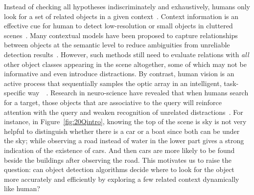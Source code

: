 Instead of checking all hypotheses indiscriminately and exhaustively, humans only look for a set of related objects in a given context~\cite{biederman1982scene, hock1974contextual}. Context information is an effective cue for human to detect low-resolution or small objects in cluttered scenes~\cite{parikh2012exploring}. Many contextual models have been proposed to capture relationships between objects at the semantic level to reduce ambiguities from unreliable detection results~\cite{gould2009decomposing, galleguillos2010context, ladicky2010graph}. %
However, such methods still need to evaluate  relations with \emph{all} other object classes appearing in the scene altogether, some of which may not be informative and even introduce distractions.  By contrast, human vision is an active process that sequentially samples the optic array in an intelligent, task-specific way~\cite{najemnik2005optimal}~. Research in neuro-science have revealed that when humans search for a target, those objects that are associative to the query will reinforce attention with the query and weaken recognition of unrelated distractions~\cite{moores2003associative}. 
For instance, in Figure~\ref{fig:20Qintro}, knowing the top of the scene is sky is not very helpful to distinguish whether there is a car or a boat since both can be under the sky; 
while observing a road instead of water in the lower part gives a strong indication of the existence of cars. And then cars are more likely to be found beside the buildings after observing the road.%
This motivates us to raise the question: can object detection algorithms decide where to look for the object more accurately and efficiently by exploring a few related context dynamically like human?

